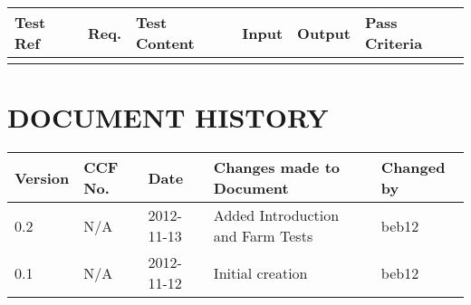\documentclass{project}
\begin{document}
\begin{tabular}{| p{2cm} | p{1cm} | p{2cm} | p{3cm} | p{3cm} | p{3cm} |}
\hline
Test Ref & Req. & Test Content & Input & Output & Pass Criteria \\
\hline
 &  &  &  &  &  \\
\hline
\end{tabular}


\clearpage
{}
\section*{DOCUMENT HISTORY}
\begin{tabular}{| l | l | l | l | l |}
\hline
Version & CCF No. & Date & Changes made to Document & Changed by \\
\hline
0.2 & N/A & 2012-11-13 & Added Introduction and Farm Tests & beb12 \\
\hline
0.1 & N/A & 2012-11-12 & Initial creation & beb12 \\
\hline
\end{tabular}
\label{thelastpage}
\end{document}
